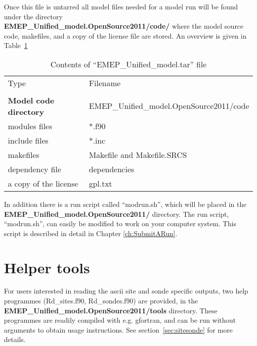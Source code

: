 Once this file is untarred all model files needed for a model run will be found under the
directory \\ {\bf EMEP\_Unified\_model.OpenSource2011/code/} where the model source code, 
makefiles, and a copy of the license file are stored. An overview is given in 
Table~\ref{Tab:modelfiles}

\begin{table}[h]
\begin{center}
\caption{Contents of ``EMEP\_Unified\_model.tar'' file
   \label{Tab:modelfiles}}
\begin{tabular}{ll}
& \\
\hline
Type      & Filename          \\
\hline
& \\
{\bf Model code directory} & EMEP\_Unified\_model.OpenSource2011/code \\ 
\hline
modules files & *.f90 \\
include files & *.inc \\
makefiles & Makefile and Makefile.SRCS \\
dependency file &  dependencies\\
a copy of the license & gpl.txt \\
\hline
\end{tabular}
\end{center}
\end{table}





In addition there is a run script called ``modrun.sh'', which will be placed 
in the \\{\bf EMEP\_Unified\_model.OpenSource2011/}  directory. The run script, 
``modrun.sh'', can easily be modified to work on your computer system. This 
script is described in detail in Chapter \ref{ch:SubmitARun}. 
 


\section{Helper tools}
\label{sec:tools}

For users interested in reading the ascii site and sonde specific outputs,
two help programmes (Rd\_sites.f90, Rd\_sondes.f90) are provided, 
in the \\{\bf EMEP\_Unified\_model.OpenSource2011/tools}  directory. These
programmes are readily compiled with e.g. gfortran, and can be run without
arguments to obtain usage instructions. See section~\ref{sec:sitesonde}
for more details.


